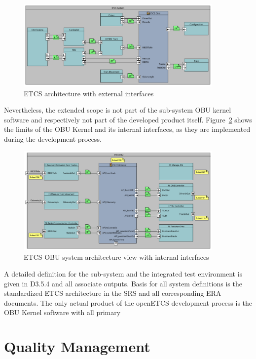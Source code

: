 \documentclass{template/openetcs_report}
\begin{document}
\begin{figure} [htbp]
\centering
\includegraphics[width=0.9\textwidth]{ETCS_system.pdf}
\caption{ETCS architecture with external interfaces}
\label{f:top_level}
\end{figure}

Nevertheless, the extended scope is not part of the sub-system OBU kernel software and respectively not part of the developed product itself. Figure~\ref{f:ETCS_OBU_decomposition} shows the limits of the OBU Kernel and its internal interfaces, as they are implemented during the development process.

\begin{figure} [htbp]
\centering
\includegraphics[width=0.9\textwidth]{images/F2_ETCS_Kernel.pdf}
\caption{ETCS OBU system architecture view with internal interfaces}
\label{f:ETCS_OBU_decomposition}
\end{figure}

A detailed definition for the sub-system and the integrated test environment is given in D3.5.4 and all associate outputs. Basis for all system definitions is the standardized ETCS architecture in the SRS and all corresponding ERA documents. The only actual product of the openETCS development process is the OBU Kernel software with all  primary

\section{Quality Management}
\end{document}
